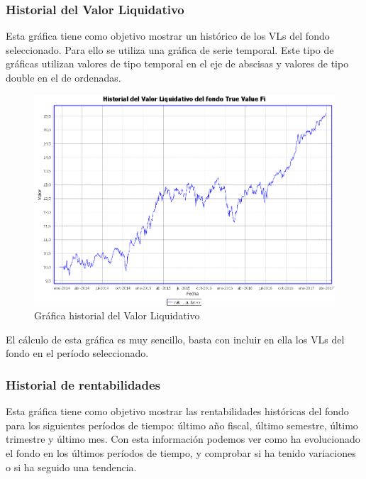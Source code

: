 \documentclass[12pt, a4paper]{book}
\begin{document}
\subsubsection{Historial del Valor Liquidativo}

Esta gráfica tiene como objetivo mostrar un histórico de los \gls{VL}s del fondo seleccionado. Para ello se utiliza una gráfica de serie temporal. Este tipo de gráficas utilizan valores de tipo temporal en el eje de abscisas y valores de tipo double en el de ordenadas.\\

	\begin{figure}[htbp]
	\centering
	\includegraphics[width=\textwidth]{figuras/historial.PNG}
	\caption{Gráfica historial del Valor Liquidativo}
	\label{fig:historial}
	\end {figure}

El cálculo de esta gráfica es muy sencillo, basta con incluir en ella los \gls{VL}s del fondo en el período seleccionado.

\newpage

\subsubsection{Historial de rentabilidades}

Esta gráfica tiene como objetivo mostrar las rentabilidades históricas del fondo para los siguientes períodos de tiempo: último año fiscal, último semestre, último trimestre y último mes. Con esta información podemos ver como ha evolucionado el fondo en los últimos períodos de tiempo, y comprobar si ha tenido variaciones o si ha seguido una tendencia.\\
\end{document}
